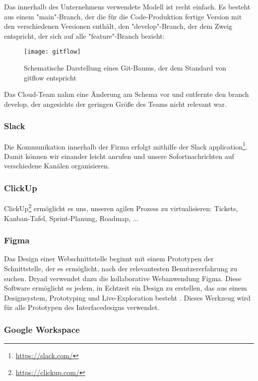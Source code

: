Das innerhalb des Unternehmens verwendete Modell ist recht einfach. Es besteht aus einem "main"-Branch, der die für die Code-Produktion fertige Version mit den verschiedenen Versionen enthält, den "develop"-Branch, der dem Zweig entspricht, der sich auf alle "feature"-Branch bezieht:

\begin{figure}[h]
  \centering
  \texttt{[image: gitflow]}
  \caption{Schematische Darstellung eines Git-Baums, der dem Standard von gitflow entspricht}
\end{figure}

Das Cloud-Team nahm eine Änderung am Schema vor und entfernte den branch develop, der angesichts der geringen Größe des Teams nicht relevant war.

\subsubsection{Slack}
Die Kommunikation innerhalb der Firma erfolgt mithilfe der Slack application\footnote{\href{https://slack.com/}{https://slack.com/}}.
Damit können wir einander leicht anrufen und unsere Sofortnachrichten auf verschiedene Kanälen organisieren.

\subsubsection{ClickUp} \label{sec:clickup}

ClickUp\footnote{\href{https://clickup.com/}{https://clickup.com/}} ermöglicht es uns, unseren agilen Prozess zu virtualisieren:
Tickets, Kanban-Tafel, Sprint-Planung, Roadmap, ...

\subsubsection{Figma} \label{sec:figma}

Das Design einer Webschnittstelle beginnt mit einem Prototypen der Schnittstelle, der es ermöglicht, nach der relevantesten Benutzererfahrung zu suchen.
Dryad verwendet dazu die kollaborative Webanwendung Figma.
Diese Software ermöglicht es jedem, in Echtzeit ein Design zu erstellen, das aus einem Designsystem, Prototyping und Live-Exploration besteht \cite{figma}.
Dieses Werkzeug wird für alle Prototypen des Interfacedesigns verwendet.

\subsubsection{Google Workspace}

